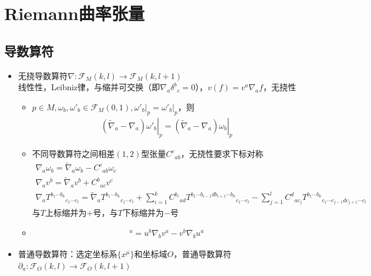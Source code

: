 \chapter{Riemann曲率张量}

\section{导数算符}

\begin{itemize}
    \item 无挠导数算符$\nabla:\mathscr{F}_M(k,l) \to \mathscr{F}_M(k,l+1)$\\
    线性性，Leibniz律，与缩并可交换（即$\nabla_a {\delta^b}_c=0$），$v(f)=v^a \nabla_a f$，无挠性
    \begin{itemize}
        \item $p \in M,\omega_b,\omega'_b \in \mathscr{F}_M(0,1),\left.\omega'_b\right|_p=\left.\omega'_b\right|_p$，则
        \begin{gather*}
            \left.(\tilde{\nabla}_a-\nabla_a)\omega'_b\right|_p=\left.(\tilde{\nabla}_a-\nabla_a)\omega_b\right|_p
        \end{gather*}
        \item 不同导数算符之间相差$(1,2)$型张量${C^c}_{ab}$，无挠性要求下标对称
        \begin{gather*}
            \nabla_a \omega_b=\tilde{\nabla}_a \omega_b-{C^c}_{ab} \omega_c
            \\
            \nabla_a v^b=\tilde{\nabla}_a v^b+{C^b}_{ac} v^c
            \\
            \nabla_a {T^{b_1 \cdots b_k}}_{c_1 \cdots c_l}=\tilde{\nabla}_a {T^{b_1 \cdots b_k}}_{c_1 \cdots c_l}+\displaystyle \sum_{i=1}^{k} {C^{b_i}}_{ad} {T^{b_1 \cdots b_{i-1} d b_{i+1} \cdots b_k}}_{c_1 \cdots c_l}-\displaystyle \sum_{j=1}^{l} {C^d}_{ac_j} {T^{b_1 \cdots b_k}}_{c_1 \cdots c_{j-1} d c_{j+1} \cdots c_l}
        \end{gather*}
        与$T$上标缩并为$+$号，与$T$下标缩并为$-$号
        \item \begin{gather*}
            [u,v]^a=u^b \nabla_b v^a-v^b \nabla_b u^a
        \end{gather*}
    \end{itemize}
    \item 普通导数算符：选定坐标系$\{x^{\mu}\}$和坐标域$O$，普通导数算符$\partial_a:\mathscr{F}_O(k,l) \to \mathscr{F}_O(k,l+1)$
    \begin{gather*}

\end{gather*}
\end{itemize}
